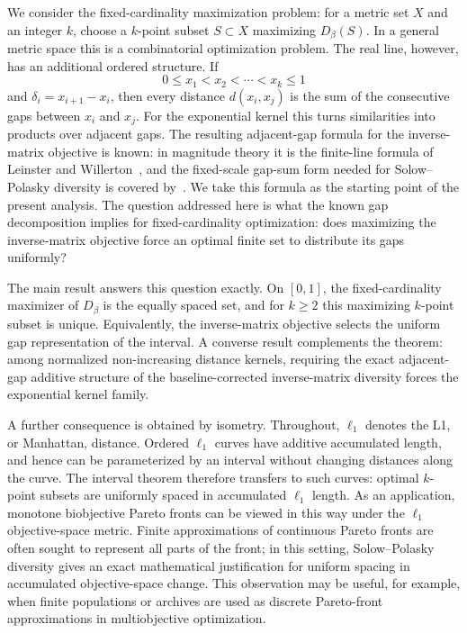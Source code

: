 \documentclass[12pt,a4paper]{article}
\begin{document}
We consider the fixed-cardinality maximization problem: for a metric set $X$ and an integer $k$, choose a $k$-point subset $S\subset X$ maximizing $D_\beta(S)$.  In a general metric space this is a combinatorial optimization problem.  The real line, however, has an additional ordered structure.  If
\[
0\leq x_1<x_2<\cdots<x_k\leq 1
\]
and $\delta_i=x_{i+1}-x_i$, then every distance $d(x_i,x_j)$ is the sum of the consecutive gaps between $x_i$ and $x_j$.  For the exponential kernel this turns similarities into products over adjacent gaps.  The resulting adjacent-gap formula for the inverse-matrix objective is known: in magnitude theory it is the finite-line formula of Leinster and Willerton~\cite{LeinsterWillerton2009}, and the fixed-scale gap-sum form needed for Solow--Polasky diversity is covered by~\cite{Emmerich2026PolynomialTime}.  We take this formula as the starting point of the present analysis.  The question addressed here is what the known gap decomposition implies for fixed-cardinality optimization: does maximizing the inverse-matrix objective force an optimal finite set to distribute its gaps uniformly?

The main result answers this question exactly.  On $[0,1]$, the fixed-cardinality maximizer of $D_\beta$ is the equally spaced set, and for $k\geq 2$ this maximizing $k$-point subset is unique.  Equivalently, the inverse-matrix objective selects the uniform gap representation of the interval.  A converse result complements the theorem: among normalized non-increasing distance kernels, requiring the exact adjacent-gap additive structure of the baseline-corrected inverse-matrix diversity forces the exponential kernel family.

A further consequence is obtained by isometry.  Throughout, $\ell_1$ denotes the L1, or Manhattan, distance.  Ordered $\ell_1$ curves have additive accumulated length, and hence can be parameterized by an interval without changing distances along the curve.  The interval theorem therefore transfers to such curves: optimal $k$-point subsets are uniformly spaced in accumulated $\ell_1$ length.  As an application, monotone biobjective Pareto fronts can be viewed in this way under the $\ell_1$ objective-space metric.  Finite approximations of continuous Pareto fronts are often sought to represent all parts of the front; in this setting, Solow--Polasky diversity gives an exact mathematical justification for uniform spacing in accumulated objective-space change.  This observation may be useful, for example, when finite populations or archives are used as discrete Pareto-front approximations in multiobjective optimization.
\end{document}
